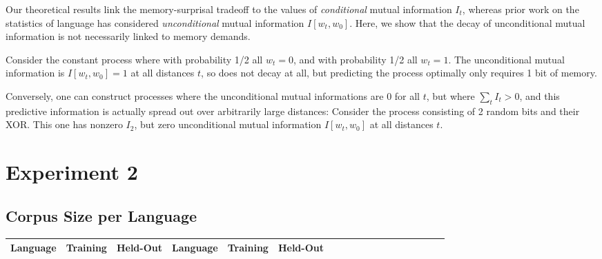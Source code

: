 \documentclass[11pt,letterpaper]{article}
\begin{document}
Our theoretical results link the memory-surprisal tradeoff to the values of \emph{conditional} mutual information $I_t$, whereas prior work on the statistics of language has considered \emph{unconditional} mutual information $I[w_t, w_0]$.
Here, we show that the decay of unconditional mutual information is not necessarily linked to memory demands.


Consider the constant process where with probability 1/2 all $w_t = 0$, and with probability 1/2 all $w_t = 1$.
The unconditional mutual information is $I[w_t, w_0] = 1$ at all distances $t$, so does not decay at all, but predicting the process optimally only requires 1 bit of memory.

Conversely, one can construct processes where the unconditional mutual informations are 0 for all $t$, but where $\sum_t I_t > 0$, and this predictive information is actually spread out over arbitrarily large distances: Consider the process consisting of 2 random bits and their XOR. This one has nonzero $I_2$, but zero unconditional  mutual information $I[w_t, w_0]$ at all distances $t$.




\section{Experiment 2}

\subsection{Corpus Size per Language}

\begin{center}
\begin{longtable}{l|ll||l|llllllllllllll}
	Language & Training & Held-Out & 	Language & Training & Held-Out\\ \hline

\end{longtable}
	\label{tab:corpora}
\end{center}
\end{document}
